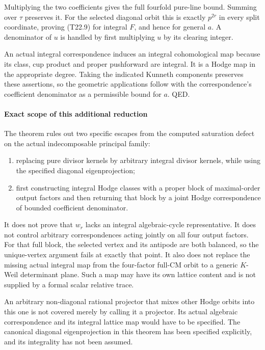 Multiplying the two coefficients gives the full fourfold pure-line bound. Summing over \(\tau\) preserves it. For the selected diagonal orbit this is exactly \(p^{2r}\) in every split coordinate, proving (T22.9) for integral \(F\), and hence for general \(a\). A denominator of \(u\) is handled by first multiplying \(u\) by its clearing integer.

An actual integral correspondence induces an integral cohomological map because its class, cup product and proper pushforward are integral. It is a Hodge map in the appropriate degree. Taking the indicated Kunneth components preserves these assertions, so the geometric applications follow with the correspondence's coefficient denominator as a permissible bound for \(a\). QED.

\paragraph{Exact scope of this additional reduction}\label{exact-scope-of-this-additional-reduction}

The theorem rules out two specific escapes from the computed saturation defect on the actual indecomposable principal family:

\begin{enumerate}
\def\labelenumi{\arabic{enumi}.}
\tightlist
\item
  replacing pure divisor kernels by arbitrary integral divisor kernels, while using the specified diagonal eigenprojection;
\item
  first constructing integral Hodge classes with a proper block of maximal-order output factors and then returning that block by a joint Hodge correspondence of bounded coefficient denominator.
\end{enumerate}

It does not prove that \(w_r\) lacks an integral algebraic-cycle representative. It does not control arbitrary correspondences acting jointly on all four output factors. For that full block, the selected vertex and its antipode are both balanced, so the unique-vertex argument fails at exactly that point. It also does not replace the missing actual integral map from the four-factor full-CM orbit to a generic \(K\)-Weil determinant plane. Such a map may have its own lattice content and is not supplied by a formal scalar relative trace.

An arbitrary non-diagonal rational projector that mixes other Hodge orbits into this one is not covered merely by calling it a projector. Its actual algebraic correspondence and its integral lattice map would have to be specified. The canonical diagonal eigenprojection in this theorem has been specified explicitly, and its integrality has not been assumed.

